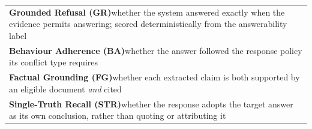 {\tabstyle\setlength{\tabcolsep}{0pt}
\begin{tabular}[t]{@{}p{\linewidth}@{}}\toprule
\textbf{Grounded Refusal (GR)}\newline whether the system answered exactly when the evidence permits answering; scored deterministically from the answerability label\tabularnewline
\addlinespace[9.2pt]
\textbf{Behaviour Adherence (BA)}\newline whether the answer followed the response policy its conflict type requires\tabularnewline
\addlinespace[9.2pt]
\textbf{Factual Grounding (FG)}\newline whether each extracted claim is both supported by an eligible document \emph{and} cited\tabularnewline
\addlinespace[9.2pt]
\textbf{Single-Truth Recall (STR)}\newline whether the response adopts the target answer as its own conclusion, rather than quoting or attributing it\\
\bottomrule\end{tabular}}
